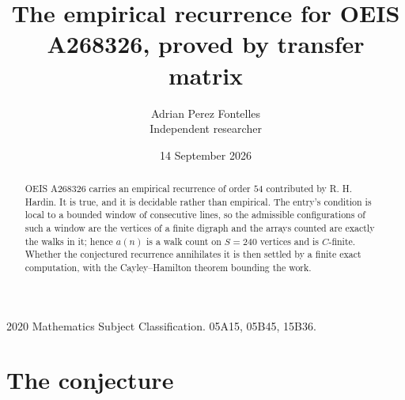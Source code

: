 \documentclass[11pt,a4paper]{article}
\title{The empirical recurrence for OEIS A268326, proved by transfer matrix}
\author{Adrian Perez Fontelles\\ \small Independent researcher}
\date{14 September 2026}
\theoremstyle{plain}
\theoremstyle{definition}
\begin{document}
\maketitle

\begin{abstract}
OEIS A268326 carries an empirical recurrence of order $54$ contributed by R. H. Hardin. It is
true, and it is decidable rather than empirical. The entry's condition is local to a bounded window of consecutive lines, so
the admissible configurations of such a window are the vertices of a finite digraph and the
arrays counted are exactly the walks in it; hence $a(n)$ is a walk count on $S=240$ vertices
and is $C$-finite. Whether the conjectured recurrence annihilates it is then settled by a
finite exact computation, with the Cayley--Hamilton theorem bounding the work.
\end{abstract}

\noindent\small 2020 Mathematics Subject Classification. 05A15, 05B45, 15B36.\normalsize

\section{The conjecture}
\end{document}
